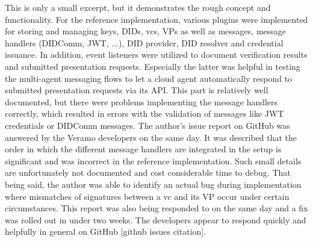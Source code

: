     This is only a small excerpt, but it demonstrates the rough concept and functionality. For the reference implementation, various plugins were implemented for storing and managing keys, \acp{DID}, \acp{vc}, \acp{VP} as well as messages, message handlers (DIDComm, JWT, ...), DID provider, DID resolver and credential issuance. In addition, event listeners were utilized to document verification results and submitted presentation requests. Especially the latter was helpful in testing the multi-agent messaging flows to let a cloud agent automatically respond to submitted presentation requests via its API. This part is relatively well documented, but there were problems implementing the message handlers correctly, which resulted in errors with the validation of messages like JWT credentials or DIDComm messages. The author's issue report on GitHub was answered by the Veramo developers on the same day. It was described that the order in which the different message handlers are integrated in the setup is significant and was incorrect in the reference implementation. Such small details are unfortunately not documented and cost considerable time to debug. That being said, the author was able to identify an actual bug during implementation where mismatches of signatures between a \ac{vc} and its \ac{VP} occur under certain circumstances. This report was also being responded to on the same day and a fix was rolled out in under two weeks. The developers appear to respond quickly and helpfully in general on GitHub [github issues citation].
    
